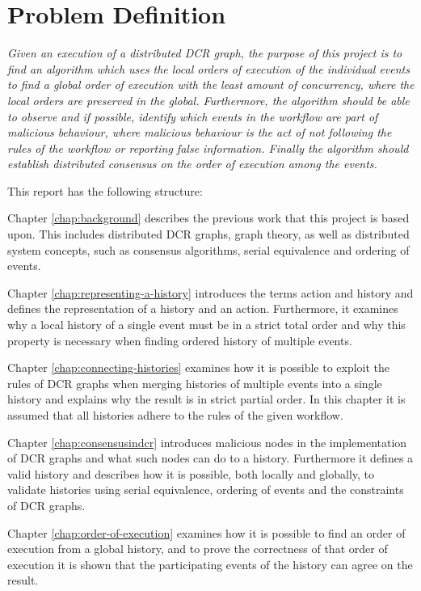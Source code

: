 \section{Problem Definition}
	\textit{Given an execution of a distributed DCR graph, the purpose of this project is to find an algorithm which uses the local orders of execution of the individual events to find a global order of execution with the least amount of concurrency, where the local orders are preserved in the global. Furthermore, the algorithm should be able to observe and if possible, identify which events in the workflow are part of malicious behaviour, where malicious behaviour is the act of not following the rules of the workflow or reporting false information. Finally the algorithm should establish distributed consensus on the order of execution among the events.}
	
	\vspace{0.4cm}
	
	\newpar
	This report has the following structure:
	
	\newpar
	Chapter \ref{chap:background} describes the previous work that this project is based upon. This includes distributed DCR graphs, graph theory, as well as distributed system concepts, such as consensus algorithms, serial equivalence and ordering of events.
		
	\newpar
	Chapter \ref{chap:representing-a-history} introduces the terms action and history and defines the representation of a history and an action.
	Furthermore, it examines why a local history of a single event must be in a strict total order and why this property is necessary when finding ordered history of multiple events. 
		
	\newpar
	Chapter \ref{chap:connecting-histories} examines how it is possible to exploit the rules of DCR graphs when merging histories of multiple events into a single history and explains why the result is in strict partial order. In this chapter it is assumed that all histories adhere to the rules of the given workflow.
	
	\newpar	Chapter \ref{chap:consensusindcr} introduces malicious nodes in the implementation of DCR graphs and what such nodes can do to a history. Furthermore it defines a valid history and describes how it is possible, both locally and globally, to validate histories using serial equivalence, ordering of events and the constraints of DCR graphs.
	
    \newpar
    Chapter \ref{chap:order-of-execution} examines how it is possible to find an order of execution from a global history, and to prove the correctness of that order of execution it is shown that the participating events of the history can agree on the result.
		
	